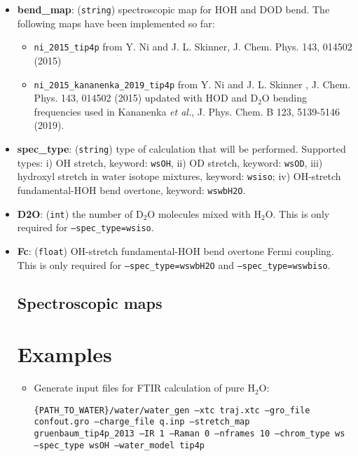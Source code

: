 \documentclass{article}
\begin{document}
\begin{itemize}
\item \textbf{bend\_map}: (\texttt{string}) spectroscopic map for HOH and DOD bend. 
The following maps have been implemented so far:
\begin{itemize}
\item \texttt{ni\_2015\_tip4p} from Y. Ni and J. L. Skinner, J. Chem. Phys. 143, 014502 (2015)
\item  \texttt{ni\_2015\_kananenka\_2019\_tip4p} from Y. Ni and J. L. Skinner , J. Chem. Phys. 143, 014502 (2015) updated with HOD and D$_2$O 
bending frequencies used in Kananenka \textit{et al.}, J. Phys. Chem. B 123, 5139-5146 (2019).
\end{itemize}


\item \textbf{spec\_type}: (\texttt{string}) type of calculation that will be performed. Supported types: i) OH stretch, keyword: \texttt{wsOH},
ii) OD stretch, keyword: \texttt{wsOD}, iii) hydroxyl stretch in water isotope mixtures, keyword: \texttt{wsiso}; iv) OH-stretch fundamental-HOH bend overtone,
keyword: \texttt{wswbH2O}.

\item \textbf{D2O}: (\texttt{int}) the number of D$_2$O molecules mixed with H$_2$O. This is only required for \texttt{--spec\_type=wsiso}.

\item \textbf{Fc}: (\texttt{float}) OH-stretch fundamental-HOH bend overtone Fermi coupling. This is only required for \texttt{--spec\_type=wswbH2O}
and \texttt{--spec\_type=wswbiso}.

\subsection{Spectroscopic maps}

\section{Examples}
\begin{itemize}

\item Generate input files for FTIR calculation of pure H$_2$O:

\texttt{\{PATH\_TO\_WATER\}/water/water\_gen --xtc traj.xtc  --gro\_file confout.gro --charge\_file q.inp --stretch\_map gruenbaum\_tip4p\_2013  --IR 1 --Raman 0 --nframes 10 --chrom\_type ws  --spec\_type wsOH  --water\_model tip4p}

\end{itemize}

 

\end{itemize}
\end{document}
